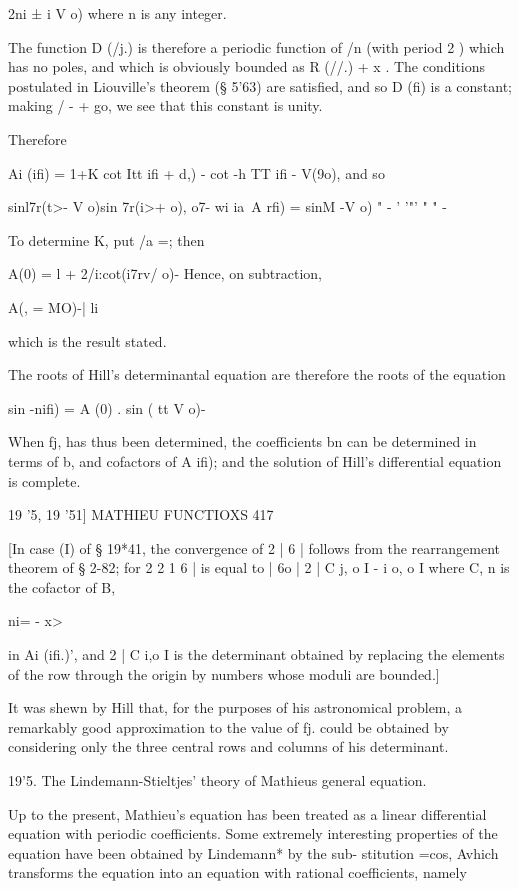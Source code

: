 2ni ± i V o) where n is any integer.

The function D (/j.) is therefore a periodic function of /n (with
period 2 ) which has no poles, and which is obviously bounded as R
(//.) + x . The conditions postulated in Liouville's theorem (§ 5'63)
are satisfied, and so D (fi) is a constant; making / - + go, we see
that this constant is unity.

Therefore

Ai (ifi) = 1+K cot Itt ifi + \/d,) - cot -h TT ifi - V(9o), and so

sinl7r(t>- V o)sin 7r(i>+\/ o), o7- wi ia\ A rfi) = sinM -V o) " - '
'"' " " -

To determine K, put /a =; then

A(0) = l + 2/i:cot(i7rv/ o)- Hence, on subtraction,

A(, = MO)-| li

which is the result stated.

The roots of Hill's determinantal equation are therefore the roots of
the equation

sin -nifi) = A (0) . sin ( tt V o)-

When fj, has thus been determined, the coefficients bn can be
determined in terms of b, and cofactors of A ifi); and the solution
of Hill's differential equation is complete.

19 '5, 19 '51] MATHIEU FUNCTIOXS 417

[In case (I) of § 19*41, the convergence of 2 | 6 | follows from the
rearrangement theorem of § 2-82; for 2 2 1 6 | is equal to | 6o | 2 |
C j, o I - i o, o I where C, n is the cofactor of B,

ni= - x>

in Ai (ifi.)', and 2 | C i,o I is the determinant obtained by
replacing the elements of the row through the origin by numbers whose
moduli are bounded.]

It was shewn by Hill that, for the purposes of his astronomical
problem, a remarkably good approximation to the value of fj. could be
obtained by considering only the three central rows and columns of his
determinant.

19'5. The Lindemann-Stieltjes' theory of Mathieus general equation.

Up to the present, Mathieu's equation has been treated as a linear
differential equation with periodic coefficients. Some extremely
interesting properties of the equation have been obtained by
Lindemann* by the sub- stitution =cos, Avhich transforms the equation
into an equation with rational coefficients, namely

